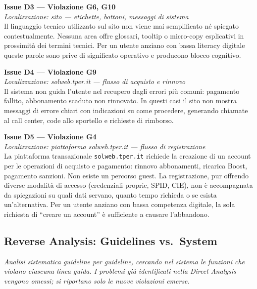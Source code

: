 ﻿\documentclass[11pt,a4paper]{article}
\begin{document}
\bigskip

\noindent\textbf{Issue D3 — Violazione G6, G10}\label{iss:D3}\\
\textit{Localizzazione: sito — etichette, bottoni, messaggi di sistema}\\

\noindent Il linguaggio tecnico utilizzato sul sito non viene mai semplificato né spiegato contestualmente. Nessuna area offre glossari, tooltip o micro-copy esplicativi in prossimità dei termini tecnici. Per un utente anziano con bassa literacy digitale queste parole sono prive di significato operativo e producono blocco cognitivo.

\bigskip

\noindent\textbf{Issue D4 — Violazione G9}\label{iss:D4}\\
\textit{Localizzazione: solweb.tper.it --- flusso di acquisto e rinnovo}\\

\noindent Il sistema non guida l'utente nel recupero dagli errori più comuni: pagamento fallito, abbonamento scaduto non rinnovato. In questi casi il sito non mostra messaggi di errore chiari con indicazioni su come procedere, generando chiamate al call center, code allo sportello e richieste di rimborso.

\bigskip

\noindent\textbf{Issue D5 — Violazione G4}\label{iss:D5}\\
\textit{Localizzazione: piattaforma solweb.tper.it --- flusso di
registrazione}\\

\noindent La piattaforma transazionale \texttt{solweb.tper.it} richiede
la creazione di un account per le operazioni di acquisto e
pagamento: rinnovo abbonamenti,
ricarica Boost, pagamento sanzioni. Non esiste un percorso guest. La
registrazione, pur offrendo diverse modalità di accesso (credenziali
proprie, SPID, CIE), non è accompagnata da spiegazioni su quali dati
servano, quanto tempo richieda o se esista un'alternativa. Per un utente
anziano con bassa competenza digitale, la sola richiesta di ``creare un
account'' è sufficiente a causare l'abbandono.

\subsection*{Reverse Analysis: Guidelines vs.\ System}

\noindent\textit{Analisi sistematica guideline per guideline, cercando nel sistema le funzioni che violano ciascuna linea guida. I problemi già identificati nella Direct Analysis vengono omessi; si riportano solo le nuove violazioni emerse.}
\end{document}
